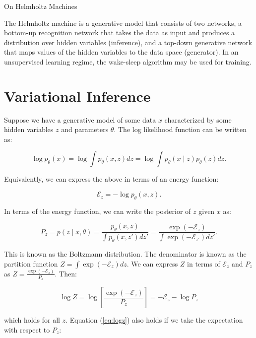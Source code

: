 \documentclass[11pt]{article}
\def\E{\mathcal{E}}
\begin{document}
\begin{center}
{\huge On Helmholtz Machines} 
\end{center}

The Helmholtz machine \cite{DayanHintonNealEtAl95} is a generative model that consists of two networks, a bottom-up recognition network that takes the data as input and produces a distribution over hidden variables (inference), and a top-down generative network that maps values of the hidden variables to the data space (generator). In an unsupervised learning regime, the wake-sleep algorithm may be used for training.

\section{Variational Inference}

Suppose we have a generative model of some data $x$ characterized by some hidden variables $z$ and parameters $\theta$. The log likelihood function can be written as:

\begin{equation}
\log p_\theta(x) = \log \int p_\theta(x, z) dz = \log \int p_\theta(x \mid z) p_\theta(z) dz.
\end{equation}

Equivalently, we can express the above in terms of an energy function:

\begin{equation}
\mathcal{E}_z= -\log p_\theta(x, z).
\label{eq:energy}
\end{equation} 

In terms of the energy function, we can write the posterior of $z$ given $x$ as:

\begin{equation}
P_z = p(z\mid x,\theta) = \frac{p_\theta(x, z)}{\int p_\theta(x, z') dz'}  = \frac{\exp(-\E_z)}{\int \exp(-\E_{z'}) dz'} .
\end{equation} 

This is known as the Boltzmann distribution. The denominator is known as the partition function $Z = \int \exp(-\mathcal{E}_{z}) dz$. We can express $Z$ in terms of $\mathcal{E}_z$ and $P_z$ as $Z = \frac{\exp(-\mathcal{E}_z)}{P_z}$. Then:

\begin{equation}
\log Z =  \log \left[ \frac{\exp(-\E_z)}{P_z} \right] = -\E_z -\log P_z
\label{eq:logz}
\end{equation}

which holds for all $z$. Equation (\ref{eq:logz}) also holds if we take the expectation with respect to $P_z$:
\end{document}
